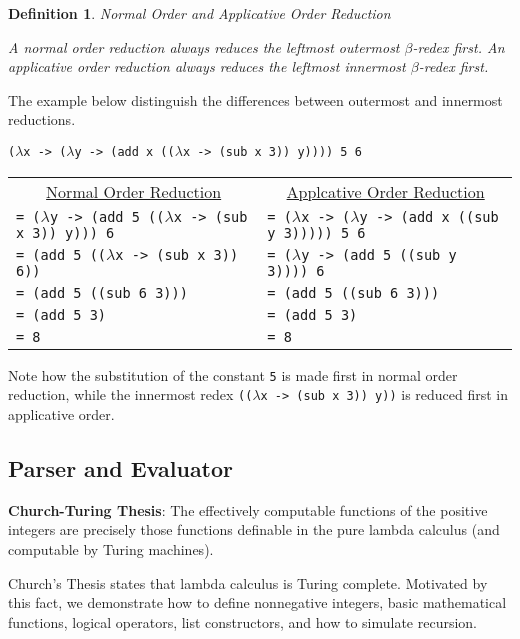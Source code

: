 \documentclass[11pt]{article}
\newtheorem{definition}{Definition}
\begin{document}
\begin{definition}{Normal Order and Applicative Order Reduction}

A normal order reduction always reduces the leftmost outermost $\beta$-redex first. An applicative order reduction always reduces the leftmost innermost $\beta$-redex first.

\end{definition}

The example  below distinguish the differences between outermost and innermost reductions.

\begin{center}
\texttt{($\lambda$x -> ($\lambda$y -> (add x (($\lambda$x -> (sub x 3)) y)))) 5 6}\parskip 0pt
\end{center}

\begin{tabular}{l | l}
\multicolumn{1}{c}{ \underline{Normal Order Reduction}} & \multicolumn{1}{c}{ \underline{Applcative Order Reduction}}\\
\texttt{= ($\lambda$y -> (add 5 (($\lambda$x -> (sub x 3)) y))) 6}&\texttt{= ($\lambda$x -> ($\lambda$y -> (add x ((sub y 3))))) 5 6}\\
\texttt{= (add 5 (($\lambda$x -> (sub x 3)) 6))}&\texttt{= ($\lambda$y -> (add 5 ((sub y 3)))) 6}\\
\texttt{= (add 5 ((sub 6 3)))}&\texttt{= (add 5 ((sub 6 3)))}\\
\texttt{= (add 5 3)}&\texttt{= (add 5 3)}\\
\texttt{= 8}&\texttt{= 8}\\
\end{tabular}

Note how the substitution of the constant \texttt{5} is made first in normal order reduction, while the innermost redex \texttt{(($\lambda$x -> (sub x 3)) y))} is reduced first in applicative order.

\subsection{Parser and Evaluator}

\textbf{Church-Turing Thesis}: The effectively computable functions of the positive integers are precisely those functions definable in the pure lambda calculus (and computable by Turing machines).

Church's Thesis states that lambda calculus is Turing complete. Motivated by this fact, we demonstrate how to define nonnegative integers, basic mathematical functions, logical operators, list constructors, and how to simulate recursion.
\end{document}
